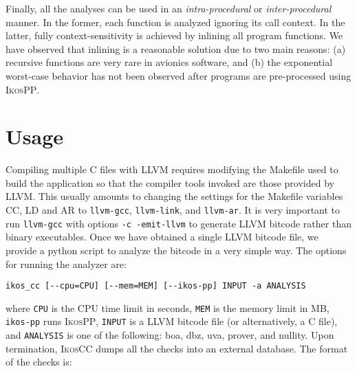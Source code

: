\documentclass[a4]{article}
\newcommand{\ignore}[1]{}
\newcommand{\ikoscc}{\textsc{IkosCC}\xspace}
\newcommand{\ikospp}{\textsc{IkosPP}\xspace}
\begin{document}
Finally, all the analyses can be used in an \emph{intra-procedural} or
\emph{inter-procedural} manner. In the former, each function is
analyzed ignoring its call context. In the latter, fully
context-sensitivity is achieved by inlining all program functions. We
have observed that inlining is a reasonable solution due to two main
reasons: (a) recursive functions are very rare in avionics software,
and (b) the exponential worst-case behavior has not been observed
after programs are pre-processed using \ikospp. %

\ignore{
\subsection{Implementation Details}
\label{subsec:implementation}

}

\section{Usage}
\label{sec:usage}

Compiling multiple C files with LLVM requires modifying the Makefile
used to build the application so that the compiler tools invoked are
those provided by LLVM. This usually amounts to changing the settings
for the Makefile variables CC, LD and AR to \texttt{llvm-gcc},
\texttt{llvm-link}, and \texttt{llvm-ar}. It is very important to run
\texttt{llvm-gcc} with options \texttt{-c -emit-llvm} to generate LLVM
bitcode rather than binary executables.
%
Once we have obtained a single LLVM bitcode file, we provide a python
script to analyze the bitcode in a very simple way. The options for
running the analyzer are:

\begin{small}
\begin{verbatim}
ikos_cc [--cpu=CPU] [--mem=MEM] [--ikos-pp] INPUT -a ANALYSIS
\end{verbatim}
\end{small}

\noindent where \texttt{CPU} is the CPU time limit in seconds,
\texttt{MEM} is the memory limit in MB, \texttt{ikos-pp} runs \ikospp,
\texttt{INPUT} is a LLVM bitcode file (or alternatively, a C file),
and \texttt{ANALYSIS} is one of the following: boa, dbz, uva, prover,
and nullity. Upon termination, \ikoscc dumps all the checks into an
external database. The format of the checks is:
\end{document}
